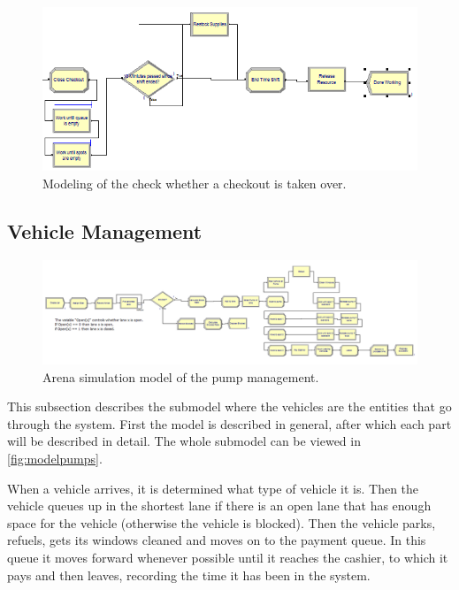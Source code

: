 \begin{figure}[h!]
\begin{center}
\includegraphics[scale=1]{images/model-description/close-restock-release.PNG}
	\caption{Modeling of the check whether a checkout is taken over.}
	\label{fig:closerestockandrelease}
\end{center}
\end{figure}

\clearpage
\subsection{Vehicle Management}\label{app:pumpdescription}
\begin{figure}[!ht]
\begin{center}
	\includegraphics[scale=0.5]{images/model-description/pumps}
	\caption{Arena simulation model of the pump management.}
	\label{fig:modelpumps}
\end{center}
\end{figure}

This subsection describes the submodel where the vehicles are the entities that go through the system. 
First the model is described in general, after which each part will be described in detail. 
The whole submodel can be viewed in \autoref{fig:modelpumps}.

When a vehicle arrives, it is determined what type of vehicle it is. Then the vehicle queues up in the shortest lane if there is an open lane that has enough space for the vehicle (otherwise the vehicle is blocked). Then the vehicle parks, refuels, gets its windows cleaned and moves on to the payment queue. In this queue it moves forward whenever possible until it reaches the cashier, to which it pays and then leaves, recording the time it has been in the system.


